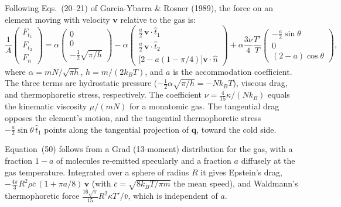\documentclass[11pt]{article}
\newcommand{\chg}[1]{\marginpar{\raggedright\footnotesize\textcolor{red!70!black}{\textsf{#1}}}}
\newcommand{\vect}[1]{\bm{#1}}
\begin{document}
Following Eqs.~(20--21) of Garcia-Ybarra \& Rosner (1989), the force on an element moving with velocity $\vect v$ relative to the gas is:\chg{C14}
\begin{equation}
  \frac1A\begin{pmatrix}F_{t_1}\\ F_{t_2}\\ F_n\end{pmatrix}
  = \alpha\begin{pmatrix}0\\0\\-\frac12\sqrt{\pi/h}\end{pmatrix}
  - \alpha\begin{pmatrix}\frac a2\,\vect v\cdot\hat t_1\\ \frac a2\,\vect v\cdot\hat t_2\\ \big[2-a(1-\pi/4)\big]\vect v\cdot\hat n\end{pmatrix}
  + \alpha\frac{3\nu}{4}\frac{T'}{T}\begin{pmatrix}-\frac a2\sin\theta\\ 0\\ (2-a)\cos\theta\end{pmatrix},
\end{equation}
where $\alpha=mN/\sqrt{\pi h}$, $h=m/(2k_BT)$, and $a$ is the accommodation coefficient. The three terms are hydrostatic pressure ($-\frac12\alpha\sqrt{\pi/h}=-Nk_BT$), viscous drag, and thermophoretic stress, respectively. The coefficient $\nu=\frac{4}{15}\kappa/(Nk_B)$ equals the kinematic viscosity $\mu/(mN)$ for a monatomic gas. The tangential drag opposes the element's motion, and the tangential thermophoretic stress $-\frac a2\sin\theta\,\hat t_1$ points along the tangential projection of $\vect q$, toward the cold side.

Equation~(50) follows from a Grad (13-moment) distribution for the gas, with a fraction $1-a$ of molecules re-emitted specularly and a fraction $a$ diffusely at the gas temperature. Integrated over a sphere of radius $R$ it gives Epstein's drag, $-\frac{4\pi}{3}R^2\rho\bar c\,(1+\pi a/8)\,\vect v$ (with $\bar c=\sqrt{8k_BT/\pi m}$ the mean speed), and Waldmann's thermophoretic force $\frac{16\sqrt\pi}{15}R^2\kappa T'/\bar v$, which is independent of $a$.

\end{document}
